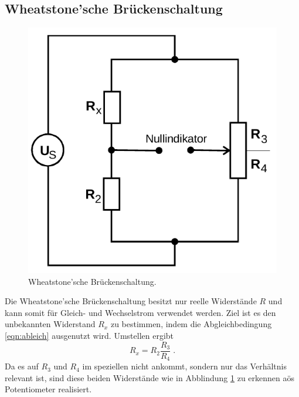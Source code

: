 \subsection{Wheatstone'sche Brückenschaltung}
\label{sec:wheatstone}
\begin{figure}[H]
    \centering
    \includegraphics[scale=0.4]{pictures/2-wheatstone.png}
    \caption{Wheatstone'sche Brückenschaltung. \cite{AP01}}
    \label{fig:wheatstone}
\end{figure}
Die Wheatstone'sche Brückenschaltung besitzt nur reelle Widerstände $R$ und kann somit für Gleich- und Wechselstrom verwendet werden.
Ziel ist es den unbekannten Widerstand $R_x$ zu bestimmen, indem die Abgleichbedingung \eqref{eqn:ableich} ausgenutzt wird. Umstellen
ergibt
\begin{equation}
    R_x=R_2\frac{R_3}{R_4} \;.
    \label{eqn:wheatstone}
\end{equation}
Da es auf $R_3$ und $R_4$ im speziellen nicht ankommt, sondern nur das Verhältnis relevant ist, sind diese beiden Widerstände wie in 
Abblindung \ref{fig:wheatstone} zu erkennen aös Potentiometer realisiert. 

